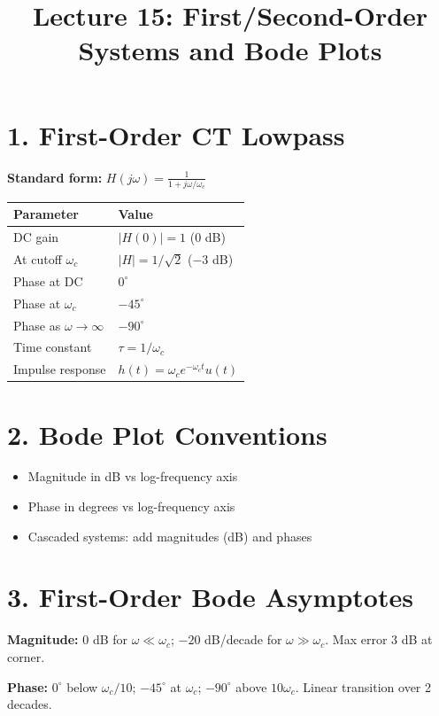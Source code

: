 \documentclass[11pt]{article}
\title{Lecture 15: First/Second-Order Systems and Bode Plots}
\author{}
\date{}
\begin{document}
\maketitle

\section*{1. First-Order CT Lowpass}

\textbf{Standard form:} $H(j\omega) = \frac{1}{1 + j\omega/\omega_c}$

\begin{center}
\begin{tabular}{|l|l|}
\hline
\textbf{Parameter} & \textbf{Value} \\
\hline
DC gain & $|H(0)| = 1$ (0 dB) \\
\hline
At cutoff $\omega_c$ & $|H| = 1/\sqrt{2}$ ($-3$ dB) \\
\hline
Phase at DC & $0^\circ$ \\
\hline
Phase at $\omega_c$ & $-45^\circ$ \\
\hline
Phase as $\omega \to \infty$ & $-90^\circ$ \\
\hline
Time constant & $\tau = 1/\omega_c$ \\
\hline
Impulse response & $h(t) = \omega_c e^{-\omega_c t}u(t)$ \\
\hline
\end{tabular}
\end{center}

\section*{2. Bode Plot Conventions}
\begin{itemize}
  \item Magnitude in dB vs log-frequency axis
  \item Phase in degrees vs log-frequency axis
  \item Cascaded systems: add magnitudes (dB) and phases
\end{itemize}

\section*{3. First-Order Bode Asymptotes}

\textbf{Magnitude:} 0 dB for $\omega \ll \omega_c$; $-20$ dB/decade for $\omega \gg \omega_c$. Max error 3 dB at corner.

\textbf{Phase:} $0^\circ$ below $\omega_c/10$; $-45^\circ$ at $\omega_c$; $-90^\circ$ above $10\omega_c$. Linear transition over 2 decades.
\end{document}
